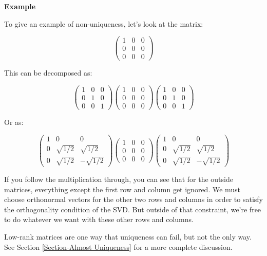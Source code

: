 \documentclass{amsbook}
\begin{document}
\begin{tcolorbox}[title=Example,colback=blue!5]
{\bfseries\Large Example}

To give an example of non-uniqueness, let's look at the matrix:

$$
\left(\begin{array}{ccc}1&0&0\\0&0&0\\0&0&0\end{array}\right)
$$

This can be decomposed as:

$$
\left(\begin{array}{ccc}1&0&0\\0&1&0\\0&0&1\end{array}\right)
\left(\begin{array}{ccc}1&0&0\\0&0&0\\0&0&0\end{array}\right)
\left(\begin{array}{ccc}1&0&0\\0&1&0\\0&0&1\end{array}\right)
$$

Or as:

$$
\left(\begin{array}{ccc}1&0&0\\0&\sqrt{1/2}&\sqrt{1/2}\\0&\sqrt{1/2}&-\sqrt{1/2}\end{array}\right)
\left(\begin{array}{ccc}1&0&0\\0&0&0\\0&0&0\end{array}\right)
\left(\begin{array}{ccc}1&0&0\\0&\sqrt{1/2}&\sqrt{1/2}\\0&\sqrt{1/2}&-\sqrt{1/2}\end{array}\right)
$$

If you follow the multiplication through, you can see that for the outside matrices, everything except the first row and column get ignored.  We must choose orthonormal vectors for the other two rows and columns in order to satisfy the orthogonality condition of the SVD.  But outside of that constraint, we're free to do whatever we want with these other rows and columns.\newline\newline

Low-rank matrices are one way that uniqueness can fail, but not the only way.  See Section \ref{Section-Almost Uniqueness} for a more complete discussion.
\end{tcolorbox}
\end{document}
